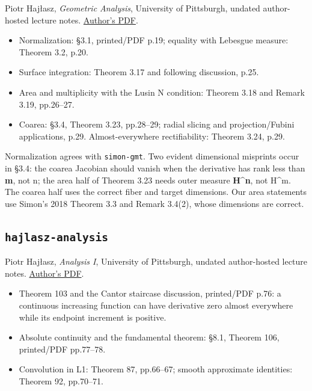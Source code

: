 \documentclass[
  11pt,
]{article}
\providecommand{\tightlist}{%
  \setlength{\itemsep}{0pt}\setlength{\parskip}{0pt}}
\begin{document}
Piotr Hajłasz, \emph{Geometric Analysis}, University of Pittsburgh,
undated author-hosted lecture notes.
\href{https://www.pitt.edu/~hajlasz/Notatki/Analysis_4.pdf}{Author's
PDF}.

\begin{itemize}
\tightlist
\item
  Normalization: §3.1, printed/PDF p.19; equality with Lebesgue measure:
  Theorem 3.2, p.20.
\item
  Surface integration: Theorem 3.17 and following discussion, p.25.
\item
  Area and multiplicity with the Lusin N condition: Theorem 3.18 and
  Remark 3.19, pp.26--27.
\item
  Coarea: §3.4, Theorem 3.23, pp.28--29; radial slicing and
  projection/Fubini applications, p.29. Almost-everywhere
  rectifiability: Theorem 3.24, p.29.
\end{itemize}

Normalization agrees with \texttt{simon-\allowbreak{}gmt}. Two evident dimensional
misprints occur in §3.4: the coarea Jacobian should vanish when the
derivative has rank less than \textbf{m}, not n; the area half of
Theorem 3.23 needs outer measure \textbf{H\^{}n}, not H\^{}m. The coarea
half uses the correct fiber and target dimensions. Our area statements
use Simon's 2018 Theorem 3.3 and Remark 3.4(2), whose dimensions are
correct.

\subsection{\texorpdfstring{\texttt{hajlasz-\allowbreak{}analysis}}{hajlasz-analysis}}\label{hajlasz-analysis}

Piotr Hajłasz, \emph{Analysis I}, University of Pittsburgh, undated
author-hosted lecture notes.
\href{https://www.pitt.edu/~hajlasz/Notatki/Analysis\%20I.pdf}{Author's
PDF}.

\begin{itemize}
\tightlist
\item
  Theorem 103 and the Cantor staircase discussion, printed/PDF p.76: a
  continuous increasing function can have derivative zero almost
  everywhere while its endpoint increment is positive.
\item
  Absolute continuity and the fundamental theorem: §8.1, Theorem 106,
  printed/PDF pp.77--78.
\item
  Convolution in L1: Theorem 87, pp.66--67; smooth approximate
  identities: Theorem 92, pp.70--71.
\end{itemize}
\end{document}
